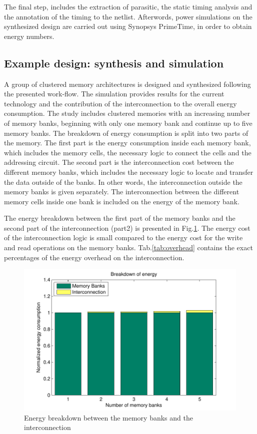 The final step, includes the extraction of  parasitic, the static timing analysis and the annotation of the timing to the netlist.
Afterwords, power simulations on the synthesized design are carried out using Synopsys PrimeTime, in order to obtain energy numbers.

\subsection{Example design: synthesis and simulation}

A group of clustered memory architectures is designed and synthesized following the presented work-flow.
The simulation provides results for the current technology and the contribution of the interconnection to the overall energy consumption.
The study includes clustered memories with an increasing number of memory banks, beginning with only one memory bank and continue up to five memory banks.
The breakdown of energy consumption is split into two parts of the memory.
The first part is the energy consumption inside each memory bank, which includes the memory cells, the necessary logic to connect the cells and the addressing circuit.
The second part is the interconnection cost between the different memory banks, which includes the necessary logic to locate and transfer the data outside of the banks. 
In other words, the interconnection outside the memory banks is given separately. 
The interconnection between the different memory cells inside one bank is included on the energy of the memory bank.

The energy breakdown between the first part of the memory banks and the second part of the interconnection (part2) is presented in Fig.\ref{fig:energyE}.
The energy cost of the interconnection logic is small compared to the energy cost for the write and read operations on the memory banks.
Tab.\ref{tab:overhead} contains the exact percentages of the energy overhead on the interconnection. 

\begin{figure}
 \centering
 \includegraphics[width = \textwidth]{E/energy.pdf}
  \caption{Energy breakdown between the memory banks and the interconnection}
 \label{fig:energyE}
 \end{figure}
 
